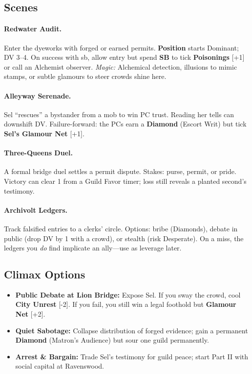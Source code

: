 \documentclass[11pt]{article}
\newcommand{\Clock}[2]{\textbf{#1} [#2]}
\newcommand{\Term}[1]{\textbf{#1}}
\newcommand{\Position}{\Term{Position}}
\newcommand{\SB}{\Term{SB}}
\newcommand{\Diamond}{\Term{Diamond}}
\begin{document}
\subsection*{Scenes}
\paragraph{Redwater Audit.} Enter the dyeworks with forged or earned permits. \Position{} starts Dominant; DV 3--4. On success with sb, allow entry but spend \SB{} to tick \Clock{Poisonings}{+1} or call an Alchemist observer. \emph{Magic:} Alchemical detection, illusions to mimic stamps, or subtle glamours to steer crowds shine here.

\paragraph{Alleyway Serenade.} Sel ``rescues'' a bystander from a mob to win PC trust. Reading her tells can downshift DV. Failure-forward: the PCs earn a \Diamond{} (Escort Writ) but tick \Clock{Sel's Glamour Net}{+1}.

\paragraph{Three-Queens Duel.} A formal bridge duel settles a permit dispute. Stakes: purse, permit, or pride. Victory can clear 1 from a Guild Favor timer; loss still reveals a planted second's testimony.

\paragraph{Archivolt Ledgers.} Track falsified entries to a clerks' circle. Options: bribe (Diamonds), debate in public (drop DV by 1 with a crowd), or stealth (risk Desperate). On a miss, the ledgers you \emph{do} find implicate an ally---use as leverage later.

\subsection*{Climax Options}
\begin{itemize}
\item \textbf{Public Debate at Lion Bridge:} Expose Sel. If you sway the crowd, cool \Clock{City Unrest}{-2}. If you fail, you still win a legal foothold but \Clock{Glamour Net}{+2}.
\item \textbf{Quiet Sabotage:} Collapse distribution of forged evidence; gain a permanent \Diamond{} (Matron's Audience) but sour one guild permanently.
\item \textbf{Arrest \& Bargain:} Trade Sel's testimony for guild peace; start Part II with social capital at Ravenswood.
\end{itemize}
\end{document}
